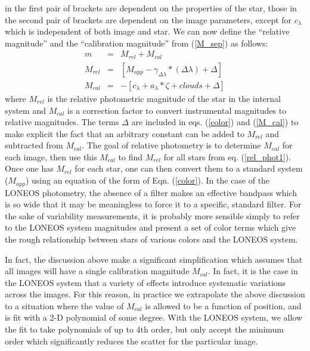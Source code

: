 \documentclass{article}
\begin{document}
in the first pair of brackets are dependent on the properties of the
star, those in the second pair of brackets are dependent on the image parameters,
except for $c_{\lambda}$ which is independent of both image and star.
We can now define the ``relative magnitude'' and the ``calibration
magnitude'' from (\ref{M_sep}) as follows:
\begin{eqnarray}
        m       & = & M_{rel} + M_{cal} \label{rel_phot1}\\
        M_{rel} & = & [M_{app} - \gamma_{\Delta\lambda}*(\Delta\lambda) + \Delta] \label{color}\\
        M_{cal} & = & - [c_{\lambda} + a_{\lambda}*\zeta + clouds + \Delta] \label{M_cal}
\end{eqnarray}
where $M_{rel}$ is the relative photometric magnitude of the star in
the internal system and $M_{cal}$ is a correction factor to convert
instrumental magnitudes to relative magnitudes.  The terms $\Delta$
are included in eqs. (\ref{color}) and (\ref{M_cal}) to make explicit
the fact that an arbitrary constant can be added to $M_{rel}$ and
subtracted from $M_{cal}$.  The goal of relative photometry is to
determine $M_{cal}$ for each image, then use this $M_{cal}$ to find
$M_{rel}$ for all stars from eq. (\ref{rel_phot1}).  Once one has
$M_{rel}$ for each star, one can then convert them to a standard
system ($M_{app}$) using an equation of the form of
Eqn. (\ref{color}).  In the case of the LONEOS photometry, the absence
of a filter makes an effective bandpass which is so wide that it may
be meaningless to force it to a specific, standard filter.  For the
sake of variability measurements, it is probably more sensible simply
to refer to the LONEOS system magnitudes and present a set of color
terms which give the rough relationship between stars of various
colors and the LONEOS system. 

In fact, the discussion above make a significant simplification which
assumes that all images will have a single calibration magnitude
$M_{cal}$.  In fact, it is the case in the LONEOS system that a
variety of effects introduce systematic variations across the images.
For this reason, in practice we extrapolate the above discussion to a
situation where the value of $M_{cal}$ is allowed to be a function of
position, and is fit with a 2-D polynomial of some degree.  With the
LONEOS system, we allow the fit to take polynomials of up to 4th
order, but only accept the minimum order which significantly reduces
the scatter for the particular image.
\end{document}
